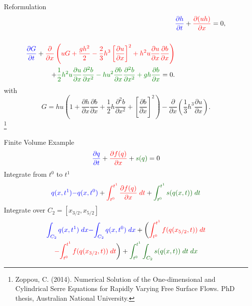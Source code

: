 \documentclass[]{beamer}
\newcommand\blfootnote[1]{%
	\begingroup
	\renewcommand\thefootnote{}\footnote{#1}%
	\addtocounter{footnote}{-1}%
	\endgroup
}
\begin{document}
\begin{frame}{Reformulation}
	\begin{align*}
	& {\color{blue}\frac{\partial h}{\partial t}} + {\color{red}\dfrac{\partial (uh)}{\partial x}} = 0,  \\ \nonumber \\
	\begin{split}
	{\color{blue}\frac{\partial G}{\partial t} }  + {\color{red}\frac{\partial}{\partial x} \left( {u} G + \frac{gh^2}{2} - \frac{2}{3}h^3 \left[\frac{\partial {u}}{\partial x}\right]^2 + h^2 {u}\frac{\partial {u}}{\partial x}\frac{\partial b}{\partial x} \right)} \\ + {\color{green!50!black}\frac{1}{2}h^2 {u} \frac{\partial {u}}{\partial x} \frac{\partial^2 b}{\partial x^2}  - h {u}^2\frac{\partial b}{\partial x}\frac{\partial^2 b}{\partial x^2} + gh\frac{\partial b}{\partial x} } = 0 .
	\end{split}
	\end{align*}
	with
	\[ G =  h {u} \left(1 + \frac{\partial h}{\partial x}\frac{\partial b}{\partial x} + \frac{1}{2}h\frac{\partial^2 b}{\partial x^2} + \left[\frac{\partial b}{\partial x}\right]^2 \right) - \frac{\partial}{\partial x}\left(\frac{1}{3}h^3  \frac{\partial {u}}{\partial x}\right).\]
	\blfootnote{Zoppou, C. (2014).
		Numerical Solution of the One-dimensional and Cylindrical
		Serre Equations for Rapidly Varying Free Surface Flows. PhD thesis, Australian National University.}
\end{frame}

\begin{frame}{Finite Volume Example}	
	\begin{equation*}
	{\color{blue}\frac{\partial q}{\partial t}} + {\color{red}\frac{\partial f(q)}{\partial x} } + {\color{green!40!black} s(q) } = 0
	\end{equation*}	
	\pause
	Integrate from $t^0$ to $t^1$
	\begin{multline*}
	{ \color{blue}q(x,t^1)} {\color{blue}-} { {\color{blue} q(x,t^0) } }+   { {\color{red}\int_{t^0}^{t^1}  \frac{\partial f(q)}{\partial x} \; dt}}   +   {\color{green!40!black}\int_{t^0}^{t^1}  s(q(x,t)) \; dt }
	\end{multline*}
	\pause
	Integrate over $C_2 = [x_{3/2}, x_{5/2}]$  
	\begin{multline*}
	{ {\color{blue}\int_{C_2} q(x,t^1) \; dx}} {\color{blue}-} { {\color{blue}\int_{C_2} q(x,t^0) \; dx } } +  \bigg(  {\color{red}\int_{t^0}^{t^1} f(q(x_{5/2},t)) \; dt} \\ {\color{red}-} {{\color{red}\int_{t^0}^{t^1} f(q(x_{3/2},t)) \; dt}}\bigg) +  { {\color{green!40!black}\int_{t^0}^{t^1} \int_{C_2} s(q(x,t)) \; dt \; dx }}
	\end{multline*}
\end{frame}
\end{document}
